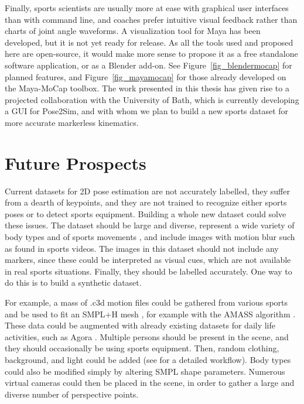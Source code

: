 Finally, sports scientists are usually more at ease with graphical user interfaces than with command line, and coaches prefer intuitive visual feedback rather than charts of joint angle waveforms. A visualization tool for Maya has been developed, but it is not yet ready for release. As all the tools used and proposed here are open-source, it would make more sense to propose it as a free standalone software application, or as a Blender add-on. See Figure~\ref{fig_blendermocap} for planned features, and Figure~\ref{fig_mayamocap} for those already developed on the Maya-MoCap toolbox. The work presented in this thesis has given rise to a projected collaboration with the University of Bath, which is currently developing a GUI for Pose2Sim, and with whom we plan to build a new sports dataset for more accurate markerless kinematics. 


\section*{Future Prospects}
Current datasets for 2D pose estimation are not accurately labelled, they suffer from a dearth of keypoints, and they are not trained to recognize either sports poses or to detect sports equipment. Building a whole new dataset could solve these issues. The dataset should be large and diverse, represent a wide variety of body types and of sports movements \cite{Seethapathi2019}, and include images with motion blur such as found in sports videos. The images in this dataset should not include any markers, since these could be interpreted as visual cues, which are not available in real sports situations. Finally, they should be labelled accurately. One way to do this is to build a synthetic dataset. 

For example, a mass of .c3d motion files could be gathered from various sports and be used to fit an SMPL+H mesh \cite{Pavlakos2019}, for example with the AMASS algorithm \cite{Mahmood2019}. These data could be augmented with already existing datasets for daily life activities, such as Agora \cite{Patel2021}. Multiple persons should be present in the scene, and they should occasionally be using sports equipment. Then, random clothing, background, and light could be added (see \cite{Wood2021,Bolanos2021} for a detailed workflow). Body types could also be modified simply by altering SMPL shape parameters. Numerous virtual cameras could then be placed in the scene, in order to gather a large and diverse number of perspective points.

